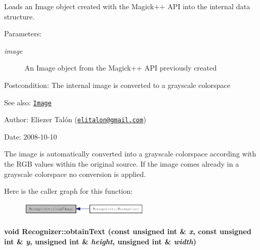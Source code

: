 Loads an Image object created with the Magick++ API into the internal data structure. 

\begin{Desc}
\item[Parameters:]
\begin{description}
\item[{\em image}]An Image object from the Magick++ API previously created\end{description}
\end{Desc}
\begin{Desc}
\item[Postcondition:]The internal image is converted to a grayscale colorspace\end{Desc}
\begin{Desc}
\item[See also:]\href{http://www.imagemagick.org/Magick++/Image.html}{\tt Image}\end{Desc}
\begin{Desc}
\item[Author:]Eliezer Talón (\href{mailto:elitalon@gmail.com}{\tt elitalon@gmail.com}) \end{Desc}
\begin{Desc}
\item[Date:]2008-10-10\end{Desc}
The image is automatically converted into a grayscale colorspace according with the RGB values within the original source. If the image comes already in a grayscale colorspace no conversion is applied. 

Here is the caller graph for this function:\nopagebreak
\begin{figure}[H]
\begin{center}
\leavevmode
\includegraphics[width=175pt]{class_recognizer_acc4244738f2577a0c344c3b3af22eb0_icgraph}
\end{center}
\end{figure}
\hypertarget{class_recognizer_d117f344b1f77711e6cbab0f15dbc269}{
\paragraph[{obtainText}]{\setlength{\rightskip}{0pt plus 5cm}void Recognizer::obtainText (const unsigned int \& {\em x}, \/  const unsigned int \& {\em y}, \/  unsigned int \& {\em height}, \/  unsigned int \& {\em width})}\hfill}
\label{class_recognizer_d117f344b1f77711e6cbab0f15dbc269}



